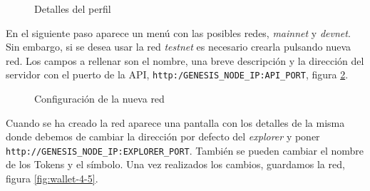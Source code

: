 \begin{figure}[H]
	\centering
	\caption{Detalles del perfil}
	\label{fig:wallet-2}
\end{figure}

En el siguiente paso aparece un menú con las posibles redes, \textit{mainnet} y \textit{devnet}. Sin embargo, si se desea usar la red \textit{testnet} es necesario crearla pulsando nueva red. Los campos a rellenar son el nombre, una breve descripción y la dirección del servidor con el puerto de la API, \texttt{http:/GENESIS\_NODE\_IP:API\_PORT}, figura \ref{fig:wallet-3}.

\begin{figure}[H]
	\centering
	\caption{Configuración de la nueva red}
	\label{fig:wallet-3}
\end{figure}

\newpage
Cuando se ha creado la red aparece una pantalla con los detalles de la misma donde debemos de cambiar la dirección por defecto del \textit{explorer} y poner \texttt{http://GENESIS\_NODE\_IP:EXPLORER\_PORT}. También se pueden cambiar el nombre de los Tokens y el símbolo. Una vez realizados los cambios, guardamos la red, figura \ref{fig:wallet-4-5}.\\

